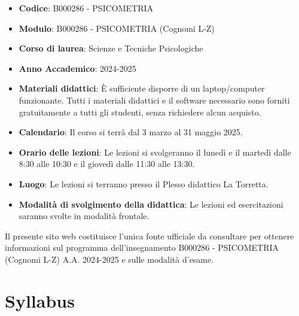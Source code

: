 \documentclass[
  letterpaper,
  krantz2]{{[}./krantz{]}}
\providecommand{\tightlist}{%
  \setlength{\itemsep}{0pt}\setlength{\parskip}{0pt}}\usepackage{longtable,booktabs,array}
\begin{document}
\begin{itemize}
\tightlist
\item
  \textbf{Codice}: B000286 - PSICOMETRIA
\item
  \textbf{Modulo}: B000286 - PSICOMETRIA (Cognomi L-Z)
\item
  \textbf{Corso di laurea}: Scienze e Tecniche Psicologiche
\item
  \textbf{Anno Accademico}: 2024-2025
\item
  \textbf{Materiali didattici}: È sufficiente disporre di un
  laptop/computer funzionante. Tutti i materiali didattici e il software
  necessario sono forniti gratuitamente a tutti gli studenti, senza
  richiedere alcun acquisto.
\item
  \textbf{Calendario}: Il corso si terrà dal 3 marzo al 31 maggio 2025.
\item
  \textbf{Orario delle lezioni}: Le lezioni si svolgeranno il lunedì e
  il martedì dalle 8:30 alle 10:30 e il giovedì dalle 11:30 alle 13:30.
\item
  \textbf{Luogo}: Le lezioni si terranno presso il Plesso didattico La
  Torretta.
\item
  \textbf{Modalità di svolgimento della didattica}: Le lezioni ed
  esercitazioni saranno svolte in modalità frontale.
\end{itemize}

\begin{tcolorbox}[enhanced jigsaw, opacityback=0, breakable, left=2mm, opacitybacktitle=0.6, coltitle=black, rightrule=.15mm, colbacktitle=quarto-callout-note-color!10!white, colframe=quarto-callout-note-color-frame, toprule=.15mm, bottomtitle=1mm, toptitle=1mm, leftrule=.75mm, titlerule=0mm, title=\textcolor{quarto-callout-note-color}{\faInfo}\hspace{0.5em}{Nota}, arc=.35mm, bottomrule=.15mm, colback=white]

Il presente sito web costituisce l'unica fonte ufficiale da consultare
per ottenere informazioni sul programma dell'insegnamento B000286 -
PSICOMETRIA (Cognomi L-Z) A.A. 2024-2025 e sulle modalità d'esame.

\end{tcolorbox}

\section*{Syllabus}\label{syllabus}

\end{document}

